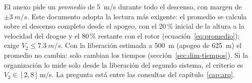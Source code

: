 \begin{nota}[Interpretación de C4]
El anexo pide un \emph{promedio} de \SI{5}{m/s} durante todo el descenso, con margen de
$\pm\SI{3}{m/s}$. Este documento adopta la lectura más exigente: el promedio se calcula
sobre el descenso completo desde el apogeo, con el 20\,\% inicial de la altura a la velocidad del drogue
y el 80\,\% restante con el rotor (ecuación~\ref{eq:promedio}); exige $V_2\le\SI{7.3}{m/s}$.
Con la liberación estimada a \SI{500}{m} (apogeo de \SI{625}{m}) el promedio no cambia: solo
cambian los tiempos (sección~\ref{sec:dim-tiempos}). Si la organización lo mide solo desde la liberación del segundo sistema, el criterio es
$V_2\in[2,8]$\,m/s. La pregunta está entre las consultas del capítulo~\ref{cap:arq}.
\end{nota}
